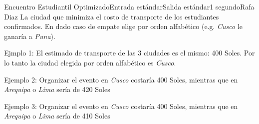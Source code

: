 \begin{problem}{Encuentro Estudiantil Optimizado}{Entrada estándar}{Salida estándar}{1 segundo}{}{Rafa Diaz}
La ciudad que minimiza el costo de transporte de los estudiantes confirmados. En dado caso de empate elige por orden alfabético (e.g. \emph{Cusco} le ganaría a \emph{Puna}).


\Example

\begin{example}

\end{example}




Ejmplo 1: El estimado de transporte de las 3 ciudades es el mismo: 400 Soles. Por lo tanto la ciudad elegida por orden alfabético es \emph{Cusco}.

Ejemplo 2:  Organizar el evento en \emph{Cusco} costaría 400 Soles, mientras que en \emph{Arequipa} o \emph{Lima} sería de 420 Soles


Ejemplo 3: Organizar el evento en \emph{Cusco} costaría 400 Soles, mientras que en \emph{Arequipa} o \emph{Lima} sería de 410 Soles


\end{problem}

